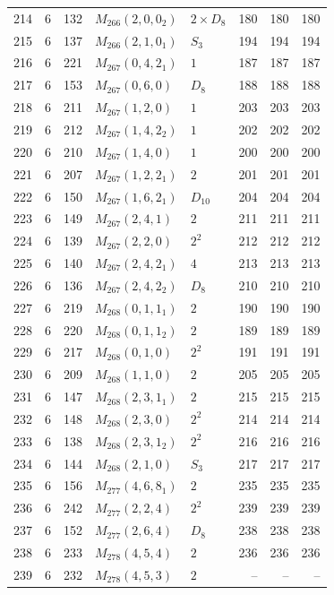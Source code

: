 \documentclass[11pt,a4paper]{article}
\begin{document}
\begin{longtable}{rrr|l|l|rrr}
214 & 6 & 132 & $M_{266}(2,0,0_2)$ & $2\times D_8$ & 180 & 180 & 180\\
215 & 6 & 137 & $M_{266}(2,1,0_1)$ & $S_3$ & 194 & 194 & 194\\
216 & 6 & 221 & $M_{267}(0,4,2_1)$ & $1$ & 187 & 187 & 187\\
217 & 6 & 153 & $M_{267}(0,6,0)$ & $D_8$ & 188 & 188 & 188\\
218 & 6 & 211 & $M_{267}(1,2,0)$ & $1$ & 203 & 203 & 203\\
219 & 6 & 212 & $M_{267}(1,4,2_2)$ & $1$ & 202 & 202 & 202\\
220 & 6 & 210 & $M_{267}(1,4,0)$ & $1$ & 200 & 200 & 200\\
221 & 6 & 207 & $M_{267}(1,2,2_1)$ & $2$ & 201 & 201 & 201\\
222 & 6 & 150 & $M_{267}(1,6,2_1)$ & $D_{10}$ & 204 & 204 & 204\\
223 & 6 & 149 & $M_{267}(2,4,1)$ & $2$ & 211 & 211 & 211\\
224 & 6 & 139 & $M_{267}(2,2,0)$ & $2^2$ & 212 & 212 & 212\\
225 & 6 & 140 & $M_{267}(2,4,2_1)$ & $4$ & 213 & 213 & 213\\
226 & 6 & 136 & $M_{267}(2,4,2_2)$ & $D_8$ & 210 & 210 & 210\\
227 & 6 & 219 & $M_{268}(0,1,1_1)$ & $2$ & 190 & 190 & 190\\
228 & 6 & 220 & $M_{268}(0,1,1_2)$ & $2$ & 189 & 189 & 189\\
229 & 6 & 217 & $M_{268}(0,1,0)$ & $2^2$ & 191 & 191 & 191\\
230 & 6 & 209 & $M_{268}(1,1,0)$ & $2$ & 205 & 205 & 205\\
231 & 6 & 147 & $M_{268}(2,3,1_1)$ & $2$ & 215 & 215 & 215\\
232 & 6 & 148 & $M_{268}(2,3,0)$ & $2^2$ & 214 & 214 & 214\\
233 & 6 & 138 & $M_{268}(2,3,1_2)$ & $2^2$ & 216 & 216 & 216\\
234 & 6 & 144 & $M_{268}(2,1,0)$ & $S_3$ & 217 & 217 & 217\\
235 & 6 & 156 & $M_{277}(4,6,8_1)$ & $2$ & 235 & 235 & 235\\
236 & 6 & 242 & $M_{277}(2,2,4)$ & $2^2$ & 239 & 239 & 239\\
237 & 6 & 152 & $M_{277}(2,6,4)$ & $D_8$ & 238 & 238 & 238\\
238 & 6 & 233 & $M_{278}(4,5,4)$ & $2$ & 236 & 236 & 236\\
239 & 6 & 232 & $M_{278}(4,5,3)$ & $2$ & -- & -- & --\\

\end{longtable}
\end{document}
